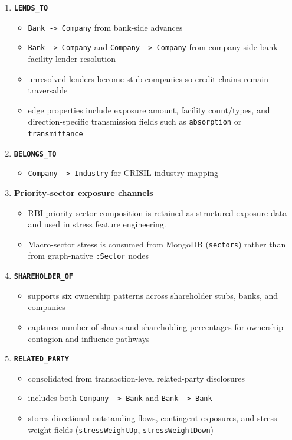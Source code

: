 \begin{enumerate}
  \item \textbf{\texttt{LENDS\_TO}}
  \begin{itemize}
    \item \texttt{Bank -> Company} from bank-side advances
    \item \texttt{Bank -> Company} and \texttt{Company -> Company} from company-side bank-facility lender resolution
    \item unresolved lenders become stub companies so credit chains remain traversable
    \item edge properties include exposure amount, facility count/types, and direction-specific transmission fields such as \texttt{absorption} or \texttt{transmittance} \cite{ref15}
  \end{itemize}

  \item \textbf{\texttt{BELONGS\_TO}}
  \begin{itemize}
    \item \texttt{Company -> Industry} for CRISIL industry mapping \cite{ref18}
  \end{itemize}

  \item \textbf{Priority-sector exposure channels}
  \begin{itemize}
    \item RBI priority-sector composition is retained as structured exposure data and used in stress feature engineering.
    \item Macro-sector stress is consumed from MongoDB (\texttt{sectors}) rather than from graph-native \texttt{:Sector} nodes \cite{ref22} \cite{ref23}
  \end{itemize}

  \item \textbf{\texttt{SHAREHOLDER\_OF}}
  \begin{itemize}
    \item supports six ownership patterns across shareholder stubs, banks, and companies
    \item captures number of shares and shareholding percentages for ownership-contagion and influence pathways \cite{ref21}
  \end{itemize}

  \item \textbf{\texttt{RELATED\_PARTY}}
  \begin{itemize}
    \item consolidated from transaction-level related-party disclosures
    \item includes both \texttt{Company -> Bank} and \texttt{Bank -> Bank}
    \item stores directional outstanding flows, contingent exposures, and stress-weight fields (\texttt{stressWeightUp}, \texttt{stressWeightDown}) \cite{ref16}
  \end{itemize}


\end{enumerate}
